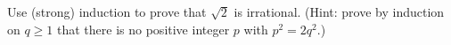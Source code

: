 Use (strong) induction to prove that $\sqrt2$ is irrational. (Hint: prove by induction on $q\ge1$ that there is no positive integer $p$ with $p^2=2q^2$.)
